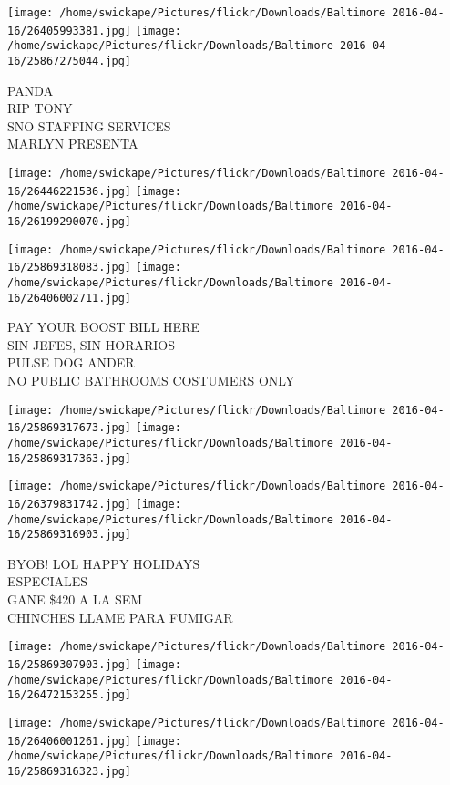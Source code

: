 \documentclass[10pt,letterpaper]{article}
\begin{document}
\texttt{[image: /home/swickape/Pictures/flickr/Downloads/Baltimore 2016-04-16/26405993381.jpg]}
\texttt{[image: /home/swickape/Pictures/flickr/Downloads/Baltimore 2016-04-16/25867275044.jpg]}

PANDA\\
RIP TONY\\
SNO STAFFING SERVICES\\
MARLYN PRESENTA
\pagebreak

\texttt{[image: /home/swickape/Pictures/flickr/Downloads/Baltimore 2016-04-16/26446221536.jpg]}
\texttt{[image: /home/swickape/Pictures/flickr/Downloads/Baltimore 2016-04-16/26199290070.jpg]}

\texttt{[image: /home/swickape/Pictures/flickr/Downloads/Baltimore 2016-04-16/25869318083.jpg]}
\texttt{[image: /home/swickape/Pictures/flickr/Downloads/Baltimore 2016-04-16/26406002711.jpg]}

PAY YOUR BOOST BILL HERE\\
SIN JEFES, SIN HORARIOS\\
PULSE DOG ANDER\\
NO PUBLIC BATHROOMS COSTUMERS ONLY
\pagebreak

\texttt{[image: /home/swickape/Pictures/flickr/Downloads/Baltimore 2016-04-16/25869317673.jpg]}
\texttt{[image: /home/swickape/Pictures/flickr/Downloads/Baltimore 2016-04-16/25869317363.jpg]}

\texttt{[image: /home/swickape/Pictures/flickr/Downloads/Baltimore 2016-04-16/26379831742.jpg]}
\texttt{[image: /home/swickape/Pictures/flickr/Downloads/Baltimore 2016-04-16/25869316903.jpg]}

BYOB! LOL HAPPY HOLIDAYS\\
ESPECIALES\\
GANE \$420 A LA SEM\\
CHINCHES LLAME PARA FUMIGAR
\pagebreak

\texttt{[image: /home/swickape/Pictures/flickr/Downloads/Baltimore 2016-04-16/25869307903.jpg]}
\texttt{[image: /home/swickape/Pictures/flickr/Downloads/Baltimore 2016-04-16/26472153255.jpg]}

\texttt{[image: /home/swickape/Pictures/flickr/Downloads/Baltimore 2016-04-16/26406001261.jpg]}
\texttt{[image: /home/swickape/Pictures/flickr/Downloads/Baltimore 2016-04-16/25869316323.jpg]}
\end{document}

